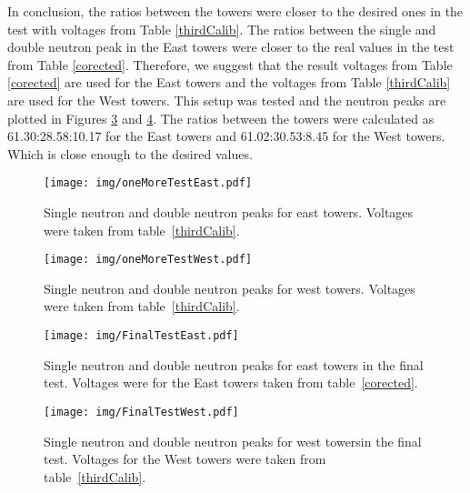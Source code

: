 \documentclass[a4paper,10pt]{report}
\begin{document}
In conclusion, the ratios between the towers were closer to the desired ones in the
test with voltages from Table \ref{thirdCalib}. The ratios between the single and double
neutron peak in the East towers were closer to the real values in the test from
Table \ref{corected}. Therefore, we suggest that the result voltages from Table \ref{corected}
are used for the East towers and the voltages from Table \ref{thirdCalib} are used for the
West towers. This setup was tested and the neutron peaks are plotted in Figures \ref{finalTestEast}
and \ref{finalTestWest}. The ratios between the towers were calculated as
61.30:28.58:10.17 for the East towers and 61.02:30.53:8.45 for the West towers.
Which is close enough to the desired values.

\begin{figure}[!htb]
\begin{center}
\texttt{[image: img/oneMoreTestEast.pdf]}
\end{center}
\caption{Single neutron and double neutron peaks for east towers.
Voltages were taken from table~\ref{thirdCalib}.}
\label{oneMoreTestEast}
\end{figure}

\begin{figure}[!htb]
\begin{center}
\texttt{[image: img/oneMoreTestWest.pdf]}
\end{center}
\caption{Single neutron and double neutron peaks for west towers. 
Voltages were taken from table~\ref{thirdCalib}.}
\label{oneMoreTestWest}
\end{figure}

\begin{figure}[!htb]
\begin{center}
\texttt{[image: img/FinalTestEast.pdf]}
\end{center}
\caption{Single neutron and double neutron peaks for east towers in the final test. Voltages were
for the East towers taken from table~\ref{corected}.}
\label{finalTestEast}
\end{figure}

\begin{figure}[!htb]
\begin{center}
\texttt{[image: img/FinalTestWest.pdf]}
\end{center}
\caption{Single neutron and double neutron peaks for west towersin the final test. Voltages
for the West towers were taken from table~\ref{thirdCalib}.}
\label{finalTestWest}
\end{figure}
\end{document}
